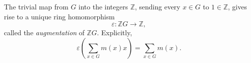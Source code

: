 The trivial map from $G$ into the integers $\mathbb{Z}$, sending every $x \in G$ to $1 \in \mathbb{Z}$, gives rise to a unique ring homomorphism
$$\varepsilon: \mathbb{Z}G \to \mathbb{Z},$$
called the \emph{augmentation} of $\mathbb{Z}G$. Explicitly,
$$\varepsilon\left( \sum_{x \in G} m(x) x \right) = \sum_{x \in G} m(x).$$
